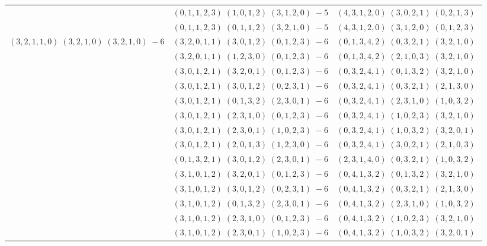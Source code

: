 \documentclass[11pt]{article}
\begin{document}
\begin{longtable}[l]{|c|c|c|}
 \cline{2-3} 
 & $(0 ,1 ,1 ,2 ,3) \;(1 ,0 ,1 ,2) \;(3 ,1 ,2 ,0) \;-5$ & $(4 ,3 ,1 ,2 ,0) \;(3 ,0 ,2 ,1) \;(0 ,2 ,1 ,3) \;$\\ 
 \cline{2-3} 
 & $(0 ,1 ,1 ,2 ,3) \;(0 ,1 ,1 ,2) \;(3 ,2 ,1 ,0) \;-5$ & $(4 ,3 ,1 ,2 ,0) \;(3 ,1 ,2 ,0) \;(0 ,1 ,2 ,3) \;$\\ \hline\multirow[t]{52}{*}{ $(3 ,2 ,1 ,1 ,0) \;(3 ,2 ,1 ,0) \;(3 ,2 ,1 ,0) \;-6$ }  & $(3 ,2 ,0 ,1 ,1) \;(3 ,0 ,1 ,2) \;(0 ,1 ,2 ,3) \;-6$ & $(0 ,1 ,3 ,4 ,2) \;(0 ,3 ,2 ,1) \;(3 ,2 ,1 ,0) \;$\\ 
 \cline{2-3} 
 & $(3 ,2 ,0 ,1 ,1) \;(1 ,2 ,3 ,0) \;(0 ,1 ,2 ,3) \;-6$ & $(0 ,1 ,3 ,4 ,2) \;(2 ,1 ,0 ,3) \;(3 ,2 ,1 ,0) \;$\\ 
 \cline{2-3} 
 & $(3 ,0 ,1 ,2 ,1) \;(3 ,2 ,0 ,1) \;(0 ,1 ,2 ,3) \;-6$ & $(0 ,3 ,2 ,4 ,1) \;(0 ,1 ,3 ,2) \;(3 ,2 ,1 ,0) \;$\\ 
 \cline{2-3} 
 & $(3 ,0 ,1 ,2 ,1) \;(3 ,0 ,1 ,2) \;(0 ,2 ,3 ,1) \;-6$ & $(0 ,3 ,2 ,4 ,1) \;(0 ,3 ,2 ,1) \;(2 ,1 ,3 ,0) \;$\\ 
 \cline{2-3} 
 & $(3 ,0 ,1 ,2 ,1) \;(0 ,1 ,3 ,2) \;(2 ,3 ,0 ,1) \;-6$ & $(0 ,3 ,2 ,4 ,1) \;(2 ,3 ,1 ,0) \;(1 ,0 ,3 ,2) \;$\\ 
 \cline{2-3} 
 & $(3 ,0 ,1 ,2 ,1) \;(2 ,3 ,1 ,0) \;(0 ,1 ,2 ,3) \;-6$ & $(0 ,3 ,2 ,4 ,1) \;(1 ,0 ,2 ,3) \;(3 ,2 ,1 ,0) \;$\\ 
 \cline{2-3} 
 & $(3 ,0 ,1 ,2 ,1) \;(2 ,3 ,0 ,1) \;(1 ,0 ,2 ,3) \;-6$ & $(0 ,3 ,2 ,4 ,1) \;(1 ,0 ,3 ,2) \;(3 ,2 ,0 ,1) \;$\\ 
 \cline{2-3} 
 & $(3 ,0 ,1 ,2 ,1) \;(2 ,0 ,1 ,3) \;(1 ,2 ,3 ,0) \;-6$ & $(0 ,3 ,2 ,4 ,1) \;(3 ,0 ,2 ,1) \;(2 ,1 ,0 ,3) \;$\\ 
 \cline{2-3} 
 & $(0 ,1 ,3 ,2 ,1) \;(3 ,0 ,1 ,2) \;(2 ,3 ,0 ,1) \;-6$ & $(2 ,3 ,1 ,4 ,0) \;(0 ,3 ,2 ,1) \;(1 ,0 ,3 ,2) \;$\\ 
 \cline{2-3} 
 & $(3 ,1 ,0 ,1 ,2) \;(3 ,2 ,0 ,1) \;(0 ,1 ,2 ,3) \;-6$ & $(0 ,4 ,1 ,3 ,2) \;(0 ,1 ,3 ,2) \;(3 ,2 ,1 ,0) \;$\\ 
 \cline{2-3} 
 & $(3 ,1 ,0 ,1 ,2) \;(3 ,0 ,1 ,2) \;(0 ,2 ,3 ,1) \;-6$ & $(0 ,4 ,1 ,3 ,2) \;(0 ,3 ,2 ,1) \;(2 ,1 ,3 ,0) \;$\\ 
 \cline{2-3} 
 & $(3 ,1 ,0 ,1 ,2) \;(0 ,1 ,3 ,2) \;(2 ,3 ,0 ,1) \;-6$ & $(0 ,4 ,1 ,3 ,2) \;(2 ,3 ,1 ,0) \;(1 ,0 ,3 ,2) \;$\\ 
 \cline{2-3} 
 & $(3 ,1 ,0 ,1 ,2) \;(2 ,3 ,1 ,0) \;(0 ,1 ,2 ,3) \;-6$ & $(0 ,4 ,1 ,3 ,2) \;(1 ,0 ,2 ,3) \;(3 ,2 ,1 ,0) \;$\\ 
 \cline{2-3} 
 & $(3 ,1 ,0 ,1 ,2) \;(2 ,3 ,0 ,1) \;(1 ,0 ,2 ,3) \;-6$ & $(0 ,4 ,1 ,3 ,2) \;(1 ,0 ,3 ,2) \;(3 ,2 ,0 ,1) \;$\\ 

\end{longtable}
\end{document}
